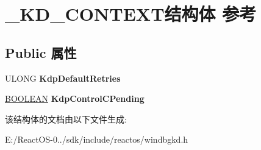 \hypertarget{struct___k_d___c_o_n_t_e_x_t}{}\section{\+\_\+\+K\+D\+\_\+\+C\+O\+N\+T\+E\+X\+T结构体 参考}
\label{struct___k_d___c_o_n_t_e_x_t}
\subsection*{Public 属性}
\begin{DoxyCompactItemize}
\item 
\mbox{\label{struct___k_d___c_o_n_t_e_x_t_a6889dfa77de529af2cefc0706de40be7}} 
U\+L\+O\+NG {\bfseries Kdp\+Default\+Retries}
\item 
\mbox{\label{struct___k_d___c_o_n_t_e_x_t_ae745d99e4c01d3526c8c59663dddf5fc}} 
\hyperlink{_processor_bind_8h_a112e3146cb38b6ee95e64d85842e380a}{B\+O\+O\+L\+E\+AN} {\bfseries Kdp\+Control\+C\+Pending}
\end{DoxyCompactItemize}


该结构体的文档由以下文件生成\+:\begin{DoxyCompactItemize}
\item 
E\+:/\+React\+O\+S-\/0../sdk/include/reactos/windbgkd.\+h\end{DoxyCompactItemize}
